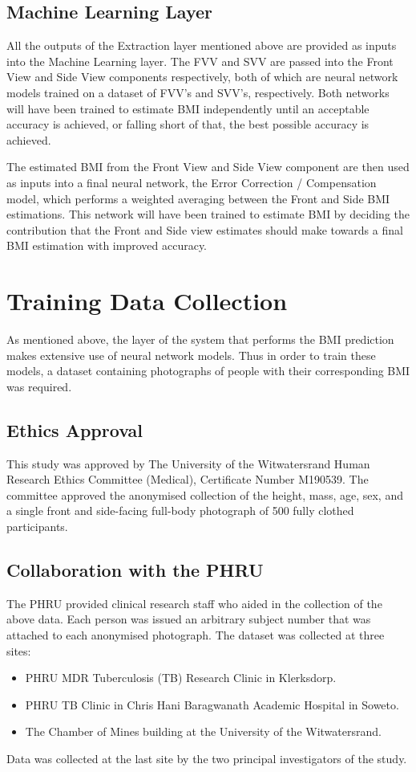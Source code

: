 \documentclass[conference]{IEEEtran}
\begin{document}
\subsection{Machine Learning Layer}
All the outputs of the Extraction layer mentioned above are provided as inputs into the Machine Learning layer.
The FVV and SVV are passed into the Front View and Side View components respectively, both of which are neural network models trained on a dataset of FVV's and SVV's, respectively.
Both networks will have been trained to estimate BMI independently until an acceptable accuracy is achieved, or falling short of that, the best possible accuracy is achieved.

The estimated BMI from the Front View and Side View component are then used as inputs into a final neural network, the Error Correction / Compensation model, which performs a weighted averaging between the Front and Side BMI estimations.
This network will have been trained to estimate BMI by deciding the contribution that the Front and Side view estimates should make towards a final BMI estimation with improved accuracy.
\section{Training Data Collection}
As mentioned above, the layer of the system that performs the BMI prediction makes extensive use of neural network models.
Thus in order to train these models, a dataset containing photographs of people with their corresponding BMI was required.
\subsection{Ethics Approval}
This study was approved by The University of the Witwatersrand Human Research Ethics Committee (Medical), Certificate Number M190539.
The committee approved the anonymised collection of the height, mass, age, sex, and a single front and side-facing full-body photograph of 500 fully clothed participants.
\subsection{Collaboration with the PHRU}
The PHRU provided clinical research staff who aided in the collection of the above data.
Each person was issued an arbitrary subject number that was attached to each anonymised photograph.
The dataset was collected at three sites:
\begin{itemize}
	\item PHRU MDR Tuberculosis (TB) Research Clinic in Klerksdorp.
	\item PHRU TB Clinic in Chris Hani Baragwanath Academic Hospital in Soweto.
	\item The Chamber of Mines building at the University of the Witwatersrand.
\end{itemize}
Data was collected at the last site by the two principal investigators of the study.
\end{document}
